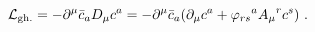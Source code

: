 \begin{equation}
{\cal{L}}_{{\rm gh.}} = -{\partial}^{\mu} {\bar{c}}_{a} D_{\mu} {c^{a}}
= -{\partial}^{\mu} {\bar{c}}_{a} ({\partial}_{\mu} c^{a} + {\varphi_{rs}}^{a} {A_{\mu}}^{r}{c^{s}})~.      
\end{equation}

